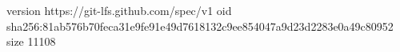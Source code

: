 version https://git-lfs.github.com/spec/v1
oid sha256:81ab576b70feca31e9fe91e49d7618132c9ee854047a9d23d2283e0a49c80952
size 11108
